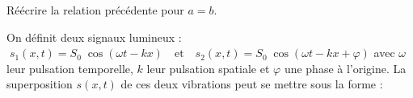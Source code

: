 	
		



\begin{enonce}
	Réécrire la relation précédente pour $a=b$.
	\end{enonce}
	
	
		


\finEntrainement







\hauteurLargeurCadreReponse		{7mm}{2.75cm}
\initialisationEntrainement

On définit deux signaux lumineux : $\; s_1 \left( x,t \right)=S_0 \; \cos \left( \omega t - k x\right) \quad \text{et} \quad s_2 \left(x,t\right)=S_0 \; \cos \left( \omega t - k x + \varphi\right)$
avec $\omega$ leur pulsation temporelle, $k$ leur pulsation spatiale et $\varphi$ une phase à l'origine. La superposition $s \left(x,t\right)$ de ces deux vibrations peut se mettre sous la forme :


